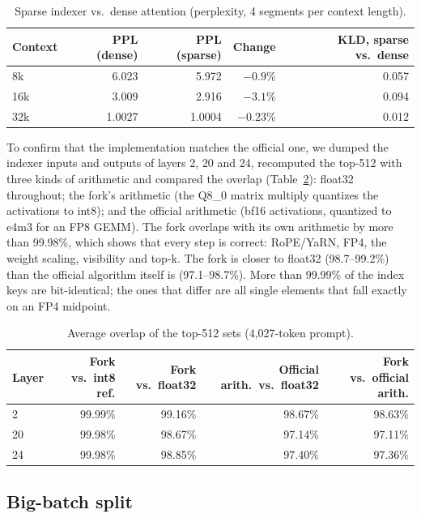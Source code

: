 \documentclass[11pt,a4paper]{article}
\begin{document}
\begin{table}[h]
  \centering
  \small
  \caption{Sparse indexer vs.\ dense attention (perplexity, 4 segments per context length).}
  \label{tab:sparse}
  \begin{tabular}{@{}l r r r r@{}}
    \toprule
    Context & PPL (dense) & PPL (sparse) & Change & KLD, sparse vs.\ dense \\
    \midrule
    8k & 6.023 & 5.972 & $-0.9\%$ & 0.057 \\
    16k & 3.009 & 2.916 & $-3.1\%$ & 0.094 \\
    32k & 1.0027 & 1.0004 & $-0.23\%$ & 0.012 \\
    \bottomrule
  \end{tabular}
\end{table}

To confirm that the implementation matches the official one, we dumped the indexer inputs and outputs of layers 2, 20 and 24, recomputed the top-512 with three kinds of arithmetic and compared the overlap (Table~\ref{tab:oracle}): float32 throughout; the fork's arithmetic (the Q8\_0 matrix multiply quantizes the activations to int8); and the official arithmetic (bf16 activations, quantized to e4m3 for an FP8 GEMM). The fork overlaps with its own arithmetic by more than 99.98\%, which shows that every step is correct: RoPE/YaRN, FP4, the weight scaling, visibility and top-k. The fork is closer to float32 (98.7--99.2\%) than the official algorithm itself is (97.1--98.7\%). More than 99.99\% of the index keys are bit-identical; the ones that differ are all single elements that fall exactly on an FP4 midpoint.

\begin{table}[h]
  \centering
  \small
  \caption{Average overlap of the top-512 sets (4,027-token prompt).}
  \label{tab:oracle}
  \begin{tabular}{@{}l r r r r@{}}
    \toprule
    Layer & Fork vs.\ int8 ref. & Fork vs.\ float32 & Official arith.\ vs.\ float32 & Fork vs.\ official arith. \\
    \midrule
    2 & 99.99\% & 99.16\% & 98.67\% & 98.63\% \\
    20 & 99.98\% & 98.67\% & 97.14\% & 97.11\% \\
    24 & 99.98\% & 98.85\% & 97.40\% & 97.36\% \\
    \bottomrule
  \end{tabular}
\end{table}

\subsection{Big-batch split}
\label{sec:bigsplit}
\end{document}
